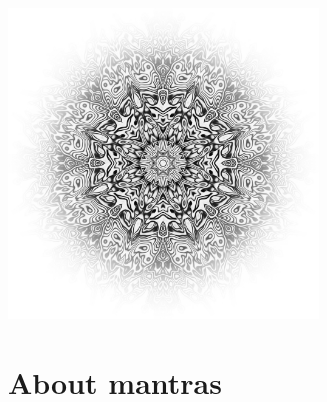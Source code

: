 \documentclass[twoside,10pt]{book}
\begin{document}
  \tableofcontents


  \begin{center}%
    \vspace*{\fill}%
    \includegraphics[width=0.618\textwidth]{shamanic_mandala_bw_ed_by_larva_CC0_1400px.jpg}
    \vspace*{\fill}%
  \end{center}

  \clearpage\scleardpage
     \section{About mantras}
       
     \clearpage\scleardpage
\end{document}
